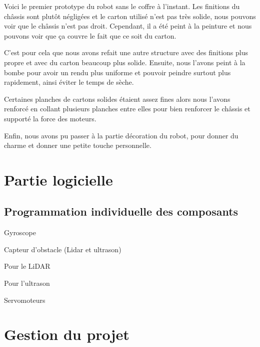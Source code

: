 \documentclass[a4paper,12pt]{report}  %
\begin{document}
Voici le premier prototype du robot sans le coffre à l’instant. Les finitions du châssis sont plutôt négligées et le carton utilisé n’est pas très solide, nous pouvons voir que le châssis n’est pas droit. Cependant, il a été peint à la peinture et nous pouvons voir que ça couvre le fait que ce soit du carton. 

C’est pour cela que nous avons refait une autre structure avec des finitions plus propre et avec du carton beaucoup plus solide. Ensuite, nous l’avons peint à la bombe pour avoir un rendu plus uniforme et pouvoir peindre surtout plus rapidement, ainsi éviter le temps de sèche. 

Certaines planches de cartons solides étaient assez fines alors nous l’avons renforcé en collant plusieurs planches entre elles pour bien renforcer le châssis et supporté la force des moteurs.

Enfin, nous avons pu passer à la partie décoration du robot, pour donner du charme et donner une petite touche personnelle.



\section{Partie logicielle}

\subsection{Programmation individuelle des composants}
Gyroscope

Capteur d’obstacle (Lidar et ultrason)

Pour le LiDAR

Pour l’ultrason

Servomoteurs



%
%
%

\section{Gestion du projet}
\end{document}
